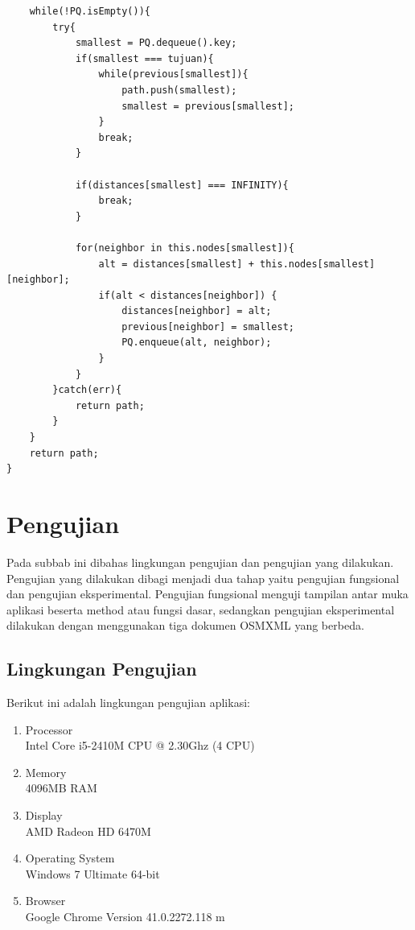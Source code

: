 \begin{itemize}
\begin{lstlisting}
	while(!PQ.isEmpty()){
		try{
			smallest = PQ.dequeue().key;
			if(smallest === tujuan){
				while(previous[smallest]){
					path.push(smallest);
					smallest = previous[smallest];
				}
				break;
			}
				
			if(distances[smallest] === INFINITY){
				break;
			}

			for(neighbor in this.nodes[smallest]){
				alt = distances[smallest] + this.nodes[smallest][neighbor];
				if(alt < distances[neighbor]) {
					distances[neighbor] = alt;
					previous[neighbor] = smallest;
					PQ.enqueue(alt, neighbor);
				}
			}
		}catch(err){
			return path;
		}
	}
	return path;
}
\end{lstlisting}
\end{itemize}

\section{Pengujian}
Pada subbab ini dibahas lingkungan pengujian dan pengujian yang dilakukan.
Pengujian yang dilakukan dibagi menjadi dua tahap yaitu pengujian fungsional 
dan pengujian eksperimental.
Pengujian fungsional menguji tampilan antar muka aplikasi beserta method atau
fungsi dasar, sedangkan pengujian eksperimental dilakukan dengan menggunakan
tiga dokumen OSMXML yang berbeda.

\subsection{Lingkungan Pengujian}
Berikut ini adalah lingkungan pengujian aplikasi:
\begin{enumerate}
  \item Processor\\
  Intel Core i5-2410M CPU @ 2.30Ghz (4 CPU)
  
  \item Memory\\
  4096MB RAM
  
  \item Display\\
  AMD Radeon HD 6470M
  
  \item Operating System\\
  Windows 7 Ultimate 64-bit
  
  \item Browser\\
  Google Chrome Version 41.0.2272.118 m 
\end{enumerate}

